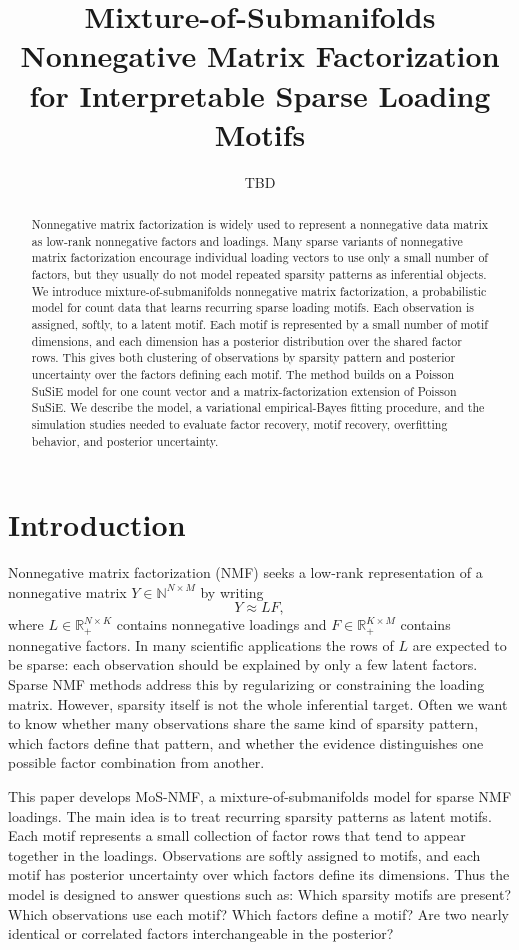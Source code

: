 \documentclass[11pt]{article}
\title{Mixture-of-Submanifolds Nonnegative Matrix Factorization for Interpretable Sparse Loading Motifs}
\author{TBD}
\date{}
\newcommand{\N}{\mathbb{N}}
\newcommand{\R}{\mathbb{R}}
\theoremstyle{definition}
\begin{document}
\maketitle

\begin{abstract}
Nonnegative matrix factorization is widely used to represent a nonnegative data
matrix as low-rank nonnegative factors and loadings. Many sparse variants of
nonnegative matrix factorization encourage individual loading vectors to use
only a small number of factors, but they usually do not model repeated sparsity
patterns as inferential objects. We introduce mixture-of-submanifolds
nonnegative matrix factorization, a probabilistic model for count data that
learns recurring sparse loading motifs. Each observation is assigned, softly, to
a latent motif. Each motif is represented by a small number of
motif dimensions, and each dimension has a posterior distribution over the shared factor
rows. This gives both clustering of observations by sparsity pattern and
posterior uncertainty over the factors defining each motif. The method builds
on a Poisson SuSiE model for one count vector and a matrix-factorization
extension of Poisson SuSiE. We describe the model, a variational empirical-Bayes fitting
procedure, and the simulation studies needed to evaluate factor recovery,
motif recovery, overfitting behavior, and posterior uncertainty.
\end{abstract}

\section{Introduction}

Nonnegative matrix factorization (NMF) seeks a low-rank representation of a
nonnegative matrix $Y \in \N^{N \times M}$ by writing
\[
  Y \approx L F,
\]
where $L \in \R_+^{N \times K}$ contains nonnegative loadings and
$F \in \R_+^{K \times M}$ contains nonnegative factors. In many scientific
applications the rows of $L$ are expected to be sparse: each observation should
be explained by only a few latent factors. Sparse NMF methods address this by
regularizing or constraining the loading matrix. However, sparsity itself is not
the whole inferential target. Often we want to know whether many observations
share the same kind of sparsity pattern, which factors define that pattern, and
whether the evidence distinguishes one possible factor combination from another.

This paper develops MoS-NMF, a mixture-of-submanifolds model for sparse NMF
loadings. The main idea is to treat recurring sparsity patterns as latent
motifs. Each motif represents a small collection of factor
rows that tend to appear together in the loadings. Observations are softly
assigned to motifs, and each motif has posterior uncertainty over which factors
define its dimensions. Thus the model is designed to answer questions such as:
Which sparsity motifs are present? Which observations use each motif? Which
factors define a motif? Are two nearly identical or correlated factors
interchangeable in the posterior?
\end{document}
